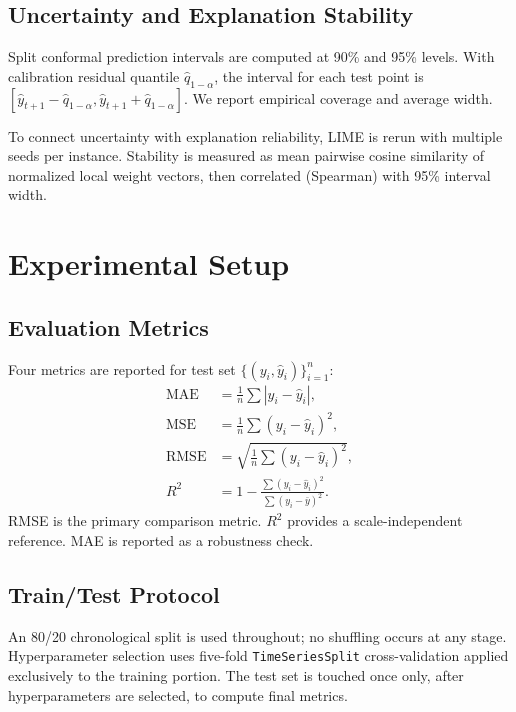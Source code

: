 \documentclass[10pt,twocolumn,letterpaper]{article}
\begin{document}
\subsection{Uncertainty and Explanation Stability}

Split conformal prediction intervals are computed at 90\% and 95\%
levels. With calibration residual quantile $\hat{q}_{1-\alpha}$, the
interval for each test point is
$[\hat{y}_{t+1}-\hat{q}_{1-\alpha},\hat{y}_{t+1}+\hat{q}_{1-\alpha}]$.
We report empirical coverage and average width.

To connect uncertainty with explanation reliability, LIME is rerun with
multiple seeds per instance. Stability is measured as mean pairwise
cosine similarity of normalized local weight vectors, then correlated
(Spearman) with 95\% interval width.

\section{Experimental Setup}

\subsection{Evaluation Metrics}

Four metrics are reported for test set $\{(y_i,\hat{y}_i)\}_{i=1}^n$:
\begin{align}
  \text{MAE}  &= \tfrac{1}{n}{\textstyle\sum}|y_i - \hat{y}_i|,
    \label{eq:mae}\\
  \text{MSE}  &= \tfrac{1}{n}{\textstyle\sum}(y_i - \hat{y}_i)^2,
    \label{eq:mse}\\
  \text{RMSE} &= \sqrt{\tfrac{1}{n}{\textstyle\sum}(y_i-\hat{y}_i)^2},
    \label{eq:rmse}\\
  R^2         &= 1 - \frac{{\textstyle\sum}(y_i-\hat{y}_i)^2}
                          {{\textstyle\sum}(y_i-\bar{y})^2}.
    \label{eq:r2}
\end{align}
RMSE is the primary comparison metric. $R^2$ provides a
scale-independent reference. MAE is reported as a robustness check.

\subsection{Train/Test Protocol}

An 80/20 chronological split is used throughout; no shuffling occurs
at any stage. Hyperparameter selection uses five-fold
\texttt{TimeSeriesSplit} cross-validation applied exclusively to the
training portion. The test set is touched once only, after
hyperparameters are selected, to compute final metrics.
\end{document}
